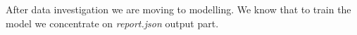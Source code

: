After data investigation we are moving to modelling. We know that to train the model we concentrate on \emph{report.json} output part.












